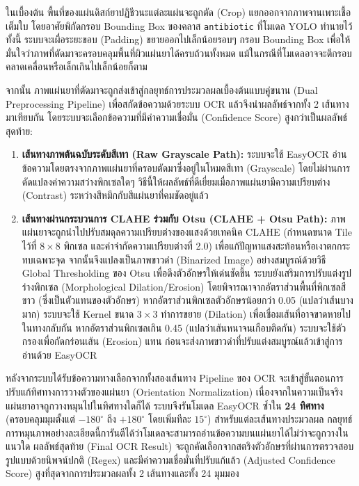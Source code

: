 ในเบื้องต้น พื้นที่ของแผ่นดิสก์ยาปฏิชีวนะแต่ละแผ่นจะถูกตัด (Crop) แยกออกจากภาพจานเพาะเชื้อเต็มใบ โดยอาศัยพิกัดกรอบ Bounding Box ของคลาส \texttt{antibiotic} ที่โมเดล YOLO ทำนายไว้ ทั้งนี้ ระบบจะเผื่อระยะขอบ (Padding) ขยายออกไปเล็กน้อยรอบๆ กรอบ Bounding Box เพื่อให้มั่นใจว่าภาพที่ตัดมาจะครอบคลุมพื้นที่ผิวแผ่นยาได้ครบถ้วนทั้งหมด แม้ในกรณีที่โมเดลอาจจะตีกรอบคลาดเคลื่อนหรือเล็กเกินไปเล็กน้อยก็ตาม

จากนั้น ภาพแผ่นยาที่ตัดมาจะถูกส่งเข้าสู่กลยุทธ์การประมวลผลเบื้องต้นแบบคู่ขนาน (Dual Preprocessing Pipeline) เพื่อสกัดข้อความด้วยระบบ OCR แล้วจึงนำผลลัพธ์จากทั้ง 2 เส้นทางมาเทียบกัน โดยระบบจะเลือกข้อความที่มีค่าความเชื่อมั่น (Confidence Score) สูงกว่าเป็นผลลัพธ์สุดท้าย:
\begin{enumerate}
  \item \textbf{เส้นทางภาพต้นฉบับระดับสีเทา (Raw Grayscale Path):} ระบบจะใช้ EasyOCR \cite{jaidedai2024easyocr} อ่านข้อความโดยตรงจากภาพแผ่นยาที่ครอบตัดมาซึ่งอยู่ในโหมดสีเทา (Grayscale) โดยไม่ผ่านการดัดแปลงค่าความสว่างพิกเซลใดๆ วิธีนี้ให้ผลลัพธ์ที่ดีเยี่ยมเมื่อภาพแผ่นยามีความเปรียบต่าง (Contrast) ระหว่างสีหมึกกับสีแผ่นยาที่คมชัดอยู่แล้ว
  \item \textbf{เส้นทางผ่านกระบวนการ CLAHE ร่วมกับ Otsu (CLAHE + Otsu Path):} ภาพแผ่นยาจะถูกนำไปปรับสมดุลความเปรียบต่างของแสงด้วยเทคนิค CLAHE (กำหนดขนาด Tile ไว้ที่ $8 \times 8$ พิกเซล และค่าจำกัดความเปรียบต่างที่ 2.0) เพื่อแก้ปัญหาแสงสะท้อนหรือเงาตกกระทบเฉพาะจุด จากนั้นจึงแปลงเป็นภาพขาวดำ (Binarized Image) อย่างสมบูรณ์ด้วยวิธี Global Thresholding ของ Otsu เพื่อดึงตัวอักษรให้เด่นชัดขึ้น ระบบยังเสริมการปรับแต่งรูปร่างพิกเซล (Morphological Dilation/Erosion) โดยพิจารณาจากอัตราส่วนพื้นที่พิกเซลสีขาว (ซึ่งเป็นตัวแทนของตัวอักษร) หากอัตราส่วนพิกเซลตัวอักษรน้อยกว่า 0.05 (แปลว่าเส้นบางมาก) ระบบจะใช้ Kernel ขนาด $3 \times 3$ ทำการขยาย (Dilation) เพื่อเชื่อมเส้นที่อาจขาดหายไป ในทางกลับกัน หากอัตราส่วนพิกเซลเกิน 0.45 (แปลว่าเส้นหนาจนเกือบติดกัน) ระบบจะใช้ตัวกรองเพื่อกัดกร่อนเส้น (Erosion) แทน ก่อนจะส่งภาพขาวดำที่ปรับแต่งสมบูรณ์แล้วเข้าสู่การอ่านด้วย EasyOCR
\end{enumerate}

หลังจากระบบได้รับข้อความทางเลือกจากทั้งสองเส้นทาง Pipeline ของ OCR จะเข้าสู่ขั้นตอนการปรับแก้ทิศทางการวางตัวของแผ่นยา (Orientation Normalization) เนื่องจากในความเป็นจริงแผ่นยาอาจถูกวางหมุนไปในทิศทางใดก็ได้ ระบบจึงรันโมเดล EasyOCR ซ้ำใน \textbf{24 ทิศทาง} (ครอบคลุมมุมตั้งแต่ $-180^\circ$ ถึง $+180^\circ$ โดยเพิ่มทีละ $15^\circ$) สำหรับแต่ละเส้นทางประมวลผล กลยุทธ์การหมุนภาพอย่างละเอียดนี้การันตีได้ว่าโมเดลจะสามารถอ่านข้อความบนแผ่นยาได้ไม่ว่าจะถูกวางในแนวใด ผลลัพธ์สุดท้าย (Final OCR Result) จะถูกคัดเลือกจากสตริงตัวอักษรที่ผ่านการตรวจสอบรูปแบบด้วยนิพจน์ปกติ (Regex) และมีค่าความเชื่อมั่นที่ปรับแก้แล้ว (Adjusted Confidence Score) สูงที่สุดจากการประมวลผลทั้ง 2 เส้นทางและทั้ง 24 มุมมอง

